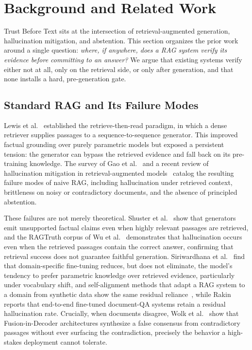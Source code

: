 \documentclass[conference]{IEEEtran}
\begin{document}
\section{Background and Related Work}
\label{sec:related}

Trust Before Text sits at the intersection of retrieval-augmented
generation, hallucination mitigation, and abstention. This section
organizes the prior work around a single question: \textit{where, if
anywhere, does a RAG system verify its evidence before committing to an
answer?} We argue that existing systems verify either not at all, only on
the retrieval side, or only after generation, and that none installs a
hard, pre-generation gate.

\subsection{Standard RAG and Its Failure Modes}
Lewis et al.~\cite{lewis2020rag} established the retrieve-then-read
paradigm, in which a dense retriever supplies passages to a
sequence-to-sequence generator. This improved factual grounding over
purely parametric models but exposed a persistent tension: the generator
can bypass the retrieved evidence and fall back on its pre-training
knowledge. The survey of Gao et al.~\cite{gao2023rag_survey} and a recent
review of hallucination mitigation in retrieval-augmented
models~\cite{zhang2025review} catalog the resulting failure modes of naive
RAG, including hallucination under retrieved context, brittleness on noisy
or contradictory documents, and the absence of principled abstention.

These failures are not merely theoretical. Shuster et
al.~\cite{shuster2021retrieval} show that generators emit unsupported
factual claims even when highly relevant passages are retrieved, and the
RAGTruth corpus of Wu et al.~\cite{wu2024ragtruth} demonstrates that
hallucination occurs even when the retrieved passages contain the correct
answer, confirming that retrieval success does not guarantee faithful
generation. Siriwardhana et al.~\cite{siriwardhana2023rag} find that
domain-specific fine-tuning reduces, but does not eliminate, the model's
tendency to prefer parametric knowledge over retrieved evidence,
particularly under vocabulary shift, and self-alignment methods that adapt a
RAG system to a domain from synthetic data show the same residual
reliance~\cite{mao2024ragstudio}, while Rakin~\cite{rakin2024rag}
reports that end-to-end fine-tuned document-QA systems retain a residual
hallucination rate. Crucially, when documents disagree, Wolk et
al.~\cite{wolk2025clinical} show that Fusion-in-Decoder architectures
synthesize a false consensus from contradictory passages without ever
surfacing the contradiction, precisely the behavior a high-stakes
deployment cannot tolerate.
\end{document}
